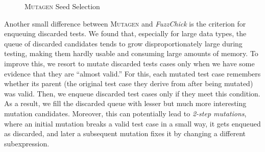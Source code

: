 \documentclass[acmsmall, anonymous]{acmart}
\newcommand{\fuzzchick}{\textit{FuzzChick}\xspace}
\newcommand{\mutagen}{\textsc{Mutagen}\xspace}
\begin{document}
\begin{figure}[t]
\vspace{-15pt}
\begin{multicols}{2}

\begin{algorithm}[H]
  \SetInd{0em}{0.75em}
  \SetAlgoLined
  \DontPrintSemicolon
\caption{\label{algo:mutagen:loop}\mutagen Testing Loop}
\end{algorithm}

\columnbreak

\begin{algorithm}[H]
  \SetInd{0em}{0.75em}
  \SetAlgoLined
  \DontPrintSemicolon
\caption{\label{algo:mutagen:pick}\mutagen Seed Selection}
\vspace{1pt}
\end{algorithm}
\end{multicols}
\vspace{-20pt}
\end{figure}

Another small difference between \mutagen and \fuzzchick is the criterion for
enqueuing discarded tests.
%
We found that, especially for large data types, the queue of discarded
candidates tends to grow disproportionately large during testing, making them
hardly usable and consuming large amounts of memory.
%
To improve this, we resort to mutate discarded tests cases only when we have
some evidence that they are ``almost valid.''
%
For this, each mutated test case remembers whether its parent (the original test
case they derive from after being mutated) was valid.
%
Then, we enqueue discarded test cases only if they meet this condition.
%
As a result, we fill the discarded queue with lesser but much more interesting
mutation candidates.
%
Moreover, this can potentially lead to \emph{2-step mutations}, where an initial
mutation breaks a valid test case in a small way, it gets enqueued as discarded,
and later a subsequent mutation fixes it by changing a different subexpression.
\end{document}
